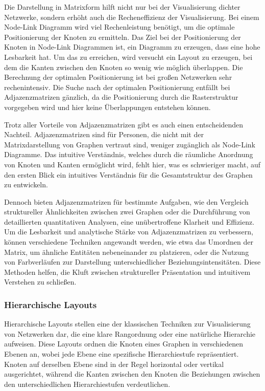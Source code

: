 Die Darstellung in Matrixform hilft nicht nur bei der Visualisierung dichter Netzwerke, sondern erhöht auch die Recheneffizienz der Visualisierung. Bei einem Node-Link Diagramm wird viel Rechenleistung benötigt, um die optimale Positionierung der Knoten zu ermitteln. Das Ziel bei der Positionierung der Knoten in Node-Link Diagrammen ist, ein Diagramm zu erzeugen, dass eine hohe Lesbarkeit hat. Um das zu erreichen, wird versucht ein Layout zu erzeugen, bei dem die Kanten zwischen den Knoten so wenig wie möglich überlappen. Die Berechnung der optimalen Positionierung ist bei großen Netzwerken sehr rechenintensiv. Die Suche nach der optimalen Positionierung entfällt bei Adjazenzmatrizen gänzlich, da die Positionierung durch die Rasterstruktur vorgegeben wird und hier keine Überlappungen entstehen können.

Trotz aller Vorteile von Adjazenzmatrizen gibt es auch einen entscheidenden Nachteil. Adjazenzmatrizen sind für Personen, die nicht mit der Matrixdarstellung von Graphen vertraut sind, weniger zugänglich als Node-Link Diagramme. Das intuitive Verständnis, welches durch die räumliche Anordnung von Knoten und Kanten ermöglicht wird, fehlt hier, was es schwieriger macht, auf den ersten Blick ein intuitives Verständnis für die Gesamtstruktur des Graphen zu entwickeln.

Dennoch bieten Adjazenzmatrizen für bestimmte Aufgaben, wie den Vergleich struktureller Ähnlichkeiten zwischen zwei Graphen oder die Durchführung von detaillierten quantitativen Analysen, eine unübertroffene Klarheit und Effizienz. Um die Lesbarkeit und analytische Stärke von Adjazenzmatrizen zu verbessern, können verschiedene Techniken angewandt werden, wie etwa das Umordnen der Matrix, um ähnliche Entitäten nebeneinander zu platzieren, oder die Nutzung von Farbverläufen zur Darstellung unterschiedlicher Beziehungsintensitäten. Diese Methoden helfen, die Kluft zwischen struktureller Präsentation und intuitivem Verstehen zu schließen.

\subsubsection{Hierarchische Layouts}

Hierarchische Layouts stellen eine der klassischen Techniken zur Visualisierung von Netzwerken dar, die eine klare Rangordnung oder eine natürliche Hierarchie aufweisen. Diese Layouts ordnen die Knoten eines Graphen in verschiedenen Ebenen an, wobei jede Ebene eine spezifische Hierarchiestufe repräsentiert. Knoten auf derselben Ebene sind in der Regel horizontal oder vertikal ausgerichtet, während die Kanten zwischen den Knoten die Beziehungen zwischen den unterschiedlichen Hierarchiestufen verdeutlichen.

